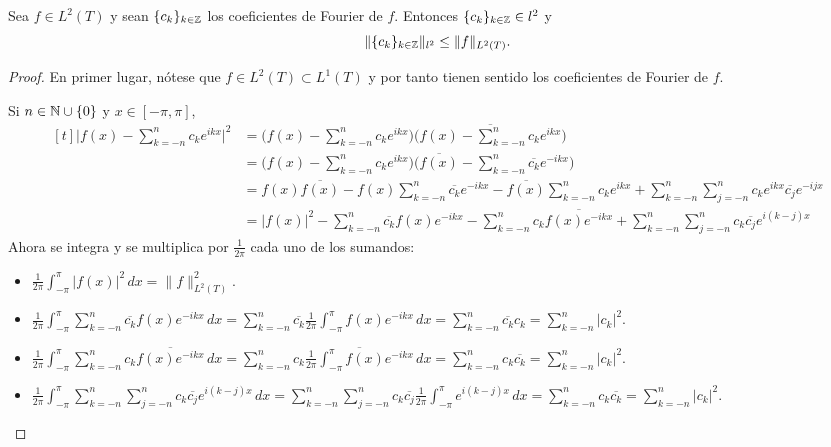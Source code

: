 \documentclass[a4paper, 11pt, oneside]{report}
\begin{document}
\begin{theorem}\label{teo:4.1.7}
  Sea $f \in L^2(T)$ y sean $\{c_k\}_{k \in \mathbb Z}$ los coeficientes de Fourier de $f$. Entonces $\{c_k\}_{k \in \mathbb Z} \in l^2$ y
  \[\|\{c_k\}_{k \in \mathbb Z}\|_{l^2} \leq \|f\|_{L^2(T)}.\]
\end{theorem}

\begin{proof}
  En primer lugar, nótese que $f \in L^2(T) \subset L^1(T)$ y por tanto tienen sentido los coeficientes de Fourier de $f$. 
  
  Si $n \in \mathbb N\cup \{0\}$ y $x \in [-\pi,\pi]$,
  \[
  \begin{aligned}[t]
  \biggl|f(x)-\sum_{k=-n}^n c_ke^{ikx}\biggr|^2 &= \biggl(f(x)-\sum_{k=-n}^n c_ke^{ikx}\biggr)\overline{\biggl(f(x)-\sum_{k=-n}^n c_ke^{ikx}\biggr)} \\
  &= \biggl(f(x)-\sum_{k=-n}^n c_ke^{ikx}\biggr)\biggl(\overline{f(x)}-\sum_{k=-n}^n \overline{c_k}e^{-ikx}\biggr) \\
  &= f(x)\overline{f(x)} -f(x)\sum_{k=-n}^n \overline{c_k}e^{-ikx} - \overline{f(x)}\sum_{k=-n}^nc_ke^{ikx}+\sum_{k=-n}^n \sum_{j=-n}^n c_ke^{ikx}\overline{c_j}e^{-ijx} \\
  &=|f(x)|^2 -\sum_{k=-n}^n \overline{c_k}f(x)e^{-ikx} - \sum_{k=-n}^nc_k\overline{f(x)e^{-ikx}}+\sum_{k=-n}^n \sum_{j=-n}^n c_k\overline{c_j}e^{i(k-j)x}
  \end{aligned}
  \]
  Ahora se integra y se multiplica por $\frac{1}{2\pi}$ cada uno de los sumandos:
  \begin{itemize}
    \item $\displaystyle \frac{1}{2\pi}\int_{-\pi}^\pi |f(x)|^2 \, dx = \|f\|_{L^2(T)}^2$.
    \item $\displaystyle \frac{1}{2\pi}\int_{-\pi}^\pi \sum_{k=-n}^n \overline{c_k}f(x)e^{-ikx} \, dx = \sum_{k=-n}^n \overline{c_k}\frac{1}{2\pi}\int_{-\pi}^\pi f(x)e^{-ikx} \, dx = \sum_{k=-n}^n \overline{c_k}c_k = \sum_{k=-n}^n |c_k|^2.$
    \item $\displaystyle \frac{1}{2\pi}\int_{-\pi}^\pi \sum_{k=-n}^n c_k\overline{f(x)e^{-ikx}} \, dx = \sum_{k=-n}^n c_k\overline{\frac{1}{2\pi}\int_{-\pi}^\pi f(x)e^{-ikx}} \, dx= \sum_{k=-n}^n c_k\overline{c_k} = \sum_{k=-n}^n |c_k|^2.$
    \item $\displaystyle \frac{1}{2\pi}\int_{-\pi}^\pi\sum_{k=-n}^n \sum_{j=-n}^n c_k\overline{c_j}e^{i(k-j)x} \, dx = \sum_{k=-n}^n \sum_{j=-n}^n c_k\overline{c_j} \frac{1}{2\pi} \int_{-\pi}^\pi e^{i(k-j)x} \, dx = \sum_{k=-n}^n c_k\overline{c_k} = \sum_{k=-n}^n |c_k|^2.$

\end{itemize}
\end{proof}
\end{document}
